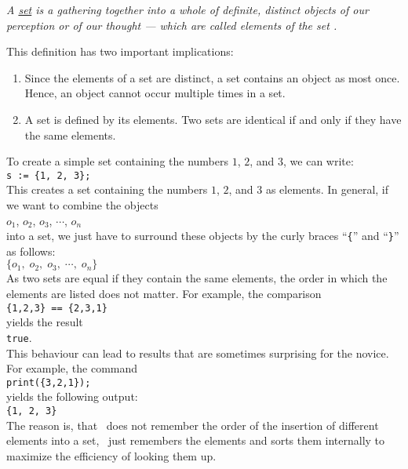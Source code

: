 \begin{minipage}{0.8\linewidth}
\textsl{A \href{https://en.wikipedia.org/wiki/Set_(mathematics)}{\emph{set}} is 
a gathering together into a whole of definite, distinct objects of our perception or of our thought
--- which are called elements of the set \cite{cantor:1895}.}
\end{minipage}
\vspace*{0.4cm}

\noindent
This definition has two important implications:
\begin{enumerate}
\item Since the elements of a set are distinct, a set contains an object as most once.
      Hence, an object cannot occur multiple times in  a set.
\item A set is defined by its elements.  Two sets are identical if and only if they have the same elements.
\end{enumerate}
To create a simple set containing the numbers $1$, $2$, and $3$, we can write:
\\[0.2cm]
\hspace*{1.3cm}
\texttt{s := \{1, 2, 3\};}
\\[0.2cm]
This creates a set containing the numbers $1$, $2$, and $3$ as elements.  In general, if we want to
combine the objects
\\[0.2cm]
\hspace*{1.3cm}
$o_1$, $o_2$, $o_3$, $\cdots$, $o_n$
\\[0.2cm]
into a set, we just have to surround these objects by the curly braces ``\texttt{\{}'' and
``\texttt{\}}'' as follows:
\\[0.2cm]
\hspace*{1.3cm}
$\{ o_1,\; o_2,\; o_3,\; \cdots,\; o_n \}$
\\[0.2cm]
As two sets are equal if they contain the same elements, the order in which the elements are listed
does not matter.  For example, the comparison
\\[0.2cm]
\hspace*{1.3cm}
\texttt{\{1,2,3\} == \{2,3,1\}}
\\[0.2cm]
yields the result
\\[0.2cm]
\hspace*{1.3cm}
\texttt{true}.
\\[0.2cm]
This behaviour can lead to results that are sometimes surprising for the novice.  For example, the command
\\[0.2cm]
\hspace*{1.3cm}
\texttt{print(\{3,2,1\});}
\\[0.2cm]
yields the following output:
\\[0.2cm]
\hspace*{1.3cm}
\texttt{\{1, 2, 3\}}
\\[0.2cm]
The reason is, that \setlx\ does not remember the order of the insertion of different elements into
a set, \setlx\ just remembers the elements and sorts them internally to maximize the efficiency of
looking them up.

